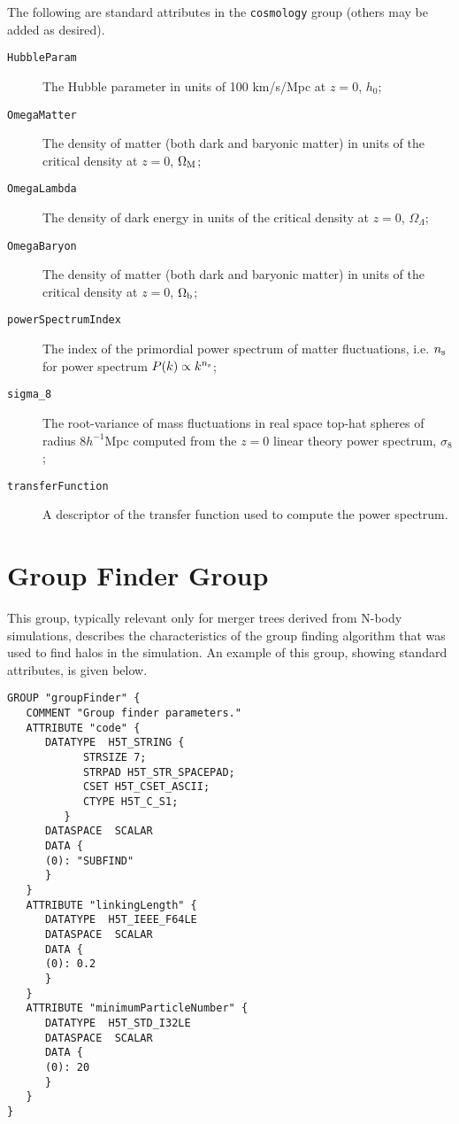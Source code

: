 The following are standard attributes in the {\tt cosmology} group (others may be added as desired).

\begin{description}
 \item [{\tt HubbleParam}] The Hubble parameter in units of 100 km/s/Mpc at $z=0$, $h_0$;
 \item [{\tt OmegaMatter}] The density of matter (both dark and baryonic matter) in units of the critical density at $z=0$, $\Omega_{\rm M}$;
 \item [{\tt OmegaLambda}] The density of dark energy in units of the critical density at $z=0$, $\Omega_\Lambda$;
 \item [{\tt OmegaBaryon}] The density of matter (both dark and baryonic matter) in units of the critical density at $z=0$, $\Omega_{\rm b}$;
 \item [{\tt powerSpectrumIndex}] The index of the primordial power spectrum of matter fluctuations, i.e. $n_{\rm s}$ for power spectrum $P(k) \propto k^{n_{\rm s}}$;
 \item [{\tt sigma\_8}] The root-variance of mass fluctuations in real space top-hat spheres of radius $8h^{-1}$Mpc computed from the $z=0$ linear theory power spectrum, $\sigma_8$;
 \item [{\tt transferFunction}] A descriptor of the transfer function used to compute the power spectrum.
\end{description}

\section{Group Finder Group}

This group, typically relevant only for merger trees derived from N-body simulations, describes the characteristics of the group finding algorithm that was used to find halos in the simulation. An example of this group, showing standard attributes, is given below.

\begin{verbatim}
GROUP "groupFinder" {
   COMMENT "Group finder parameters."
   ATTRIBUTE "code" {
      DATATYPE  H5T_STRING {
            STRSIZE 7;
            STRPAD H5T_STR_SPACEPAD;
            CSET H5T_CSET_ASCII;
            CTYPE H5T_C_S1;
         }
      DATASPACE  SCALAR
      DATA {
      (0): "SUBFIND"
      }
   }
   ATTRIBUTE "linkingLength" {
      DATATYPE  H5T_IEEE_F64LE
      DATASPACE  SCALAR
      DATA {
      (0): 0.2
      }
   }
   ATTRIBUTE "minimumParticleNumber" {
      DATATYPE  H5T_STD_I32LE
      DATASPACE  SCALAR
      DATA {
      (0): 20
      }
   }
}
\end{verbatim}

